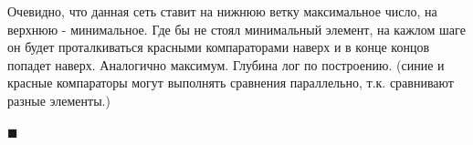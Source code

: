 \documentclass{article}
\begin{document}
  Очевидно, что данная сеть ставит на нижнюю ветку максимальное число, на верхнюю - минимальное. Где бы не стоял минимальный элемент, на кажлом шаге он будет проталкиваться красными компараторами наверх и в конце концов попадет наверх. Аналогично максимум. Глубина лог по построению. (синие и красные компараторы могут выполнять сравнения параллельно, т.к. сравнивают разные элементы.)

  \begin{flushright}
    $\blacksquare$
  \end{flushright}


 
\end{document}
